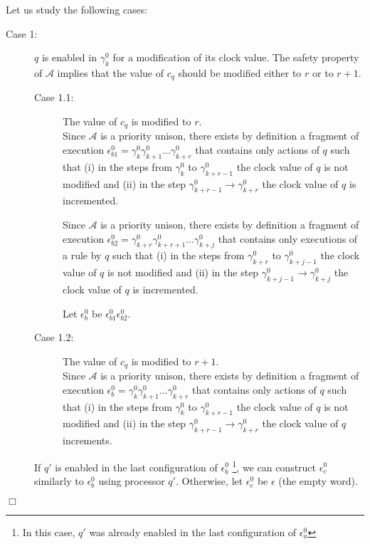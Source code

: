 \documentclass[11pt,english,letterpaper]{article}
\newenvironment{proof}{{\noindent\bf Proof. } }{{\hfill $\Box$}}
\begin{document}
\begin{proof}
Let us study the following cases:

\begin{description}
\item[Case 1:] $q$ is enabled in $\gamma_{k}^{0}$ for a modification of its clock value. The safety property of $\mathcal{A}$ implies that the value of $c_{q}$ should be modified  either to $r$ or to $r+1$.

\begin{description}
\item[Case 1.1:] The value of $c_{q}$ is modified to $r$.\\
Since $\mathcal{A}$ is a priority unison, there exists by definition a fragment of execution $\epsilon_{b1}^{0}=\gamma_{k}^{0}\gamma_{k+1}^{0}\ldots\gamma_{k+r}^{0}$ that contains only actions of $q$ such that (i) in the steps from $\gamma_{k}^{0}$ to $\gamma_{k+r-1}^{0}$ the clock value of $q$ is not modified and (ii) in the step	$\gamma^{0}_{k+r-1}\rightarrow\gamma^{0}_{k+r}$ the clock value of $q$ is incremented.

Since $\mathcal{A}$ is a priority unison, there exists by definition a fragment of execution $\epsilon_{b2}^{0}=\gamma_{k+r}^{0}\gamma_{k+r+1}^{0}\ldots\gamma_{k+j}^{0}$ that contains only executions of a rule by $q$ such that (i) in the steps from $\gamma_{k+r}^{0}$ to $\gamma_{k+j-1}^{0}$ the clock value of $q$ is not modified and (ii) in the step	$\gamma^{0}_{k+j-1}\rightarrow\gamma^{0}_{k+j}$ the clock value of $q$ is incremented.

Let  $\epsilon_{b}^{0}$ be $\epsilon_{b1}^{0}\epsilon_{b2}^{0}$.

\item[Case 1.2:] The value of $c_{q}$ is modified to $r+1$.\\
Since $\mathcal{A}$ is a priority unison, there exists by definition a fragment of execution $\epsilon_{b}^{0}=\gamma_{k}^{0}\gamma_{k+1}^{0}\ldots\gamma_{k+r}^{0}$ that contains only actions of $q$ such that (i) in the steps from $\gamma_{k}^{0}$ to $\gamma_{k+r-1}^{0}$ the clock value of $q$ is not modified and (ii) in the step	$\gamma^{0}_{k+r-1}\rightarrow\gamma^{0}_{k+r}$ the clock value of $q$ increments.
\end{description}

If $q'$ is enabled in the last configuration of $\epsilon_{b}^{0}$ \footnote{In this case, $q'$ was already enabled in the last configuration of $\epsilon_{a}^{0}$}, we can construct $\epsilon_{c}^{0}$ similarly to $\epsilon_{b}^{0}$ using processor $q'$. Otherwise, let $\epsilon_{c}^{0}$ be $\epsilon$ (the empty word).


\end{description}
\end{proof}
\end{document}
